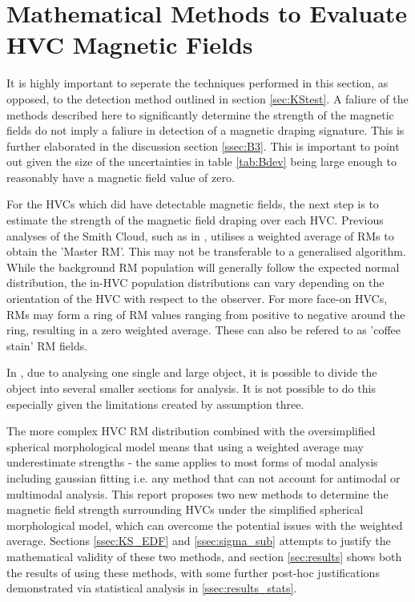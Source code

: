 \section{Mathematical Methods to Evaluate HVC Magnetic Fields}
\label{sec:evaluation}

It is highly important to seperate the techniques performed in this section, as opposed, to the detection method outlined in section \ref{sec:KStest}. A faliure of the methods described here to significantly determine the strength of the magnetic fields do not imply a faliure in detection of a magnetic draping signature. This is further elaborated in the discussion section \ref{ssec:B3}. This is important to point out given the size of the uncertainties in table \ref{tab:Bdev} being large enough to reasonably have a magnetic field value of zero.


For the HVCs which did have detectable magnetic fields, the next step is to estimate the strength of the magnetic field draping over each HVC. Previous analyses of the Smith Cloud, such as in \cite{ID5, ID26}, utilises a weighted average of RMs to obtain the 'Master RM'. This may not be transferable to a generalised algorithm. While the background RM population will generally follow the expected normal distribution, the in-HVC population distributions can vary depending on the orientation of the HVC with respect to the observer. For more face-on HVCs, RMs may form a ring of RM values ranging from positive to negative around the ring, resulting in a zero weighted average. These can also be refered to as 'coffee stain' RM fields.


In \cite{ID5, ID26}, due to analysing one single and large object, it is possible to divide the object into several smaller sections for analysis. It is not possible to do this especially given the limitations created by assumption three.


The more complex HVC RM distribution combined with the oversimplified spherical morphological model means that using a weighted average may underestimate strengths - the same applies to most forms of modal analysis including gaussian fitting i.e. any method that can not account for antimodal or multimodal analysis. This report proposes two new methods to determine the magnetic field strength surrounding HVCs under the simplified spherical morphological model, which can overcome the potential issues with the weighted average. Sections \ref{ssec:KS_EDF} and \ref{ssec:sigma_sub} attempts to justify the mathematical validity of these two methods, and section \ref{sec:results} shows both the results of using these methods, with some further post-hoc justifications demonstrated via statistical analysis in \ref{ssec:results_stats}.



